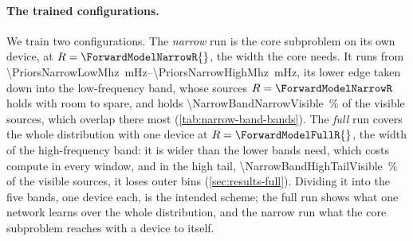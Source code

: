 \paragraph{The trained configurations.}
\label{sec:narrow-band-bands}
We train two configurations. The \emph{narrow} run is the core
subproblem on its own device, at $R=\ForwardModelNarrowR{}$, the width the core needs. It runs from
\qtyrange{\PriorsNarrowLowMhz}{\PriorsNarrowHighMhz}{\milli\hertz}, its lower edge taken down into
the low-frequency band, whose sources $R=\ForwardModelNarrowR$ holds with room to spare, and holds
\qty{\NarrowBandNarrowVisible}{\percent} of the visible sources, which overlap there most
(\cref{tab:narrow-band-bands}). The \emph{full} run covers the whole distribution with one device at
$R=\ForwardModelFullR{}$, the width of the high-frequency band: it is wider than the lower bands need,
which costs compute in every window, and in the high tail, \qty{\NarrowBandHighTailVisible}{\percent}
of the visible sources, it loses outer bins (\cref{sec:results-full}). Dividing it into the five
bands, one device each, is the intended scheme; the full run shows what one network learns over the
whole distribution, and the narrow run what the core subproblem reaches with a device to itself.

